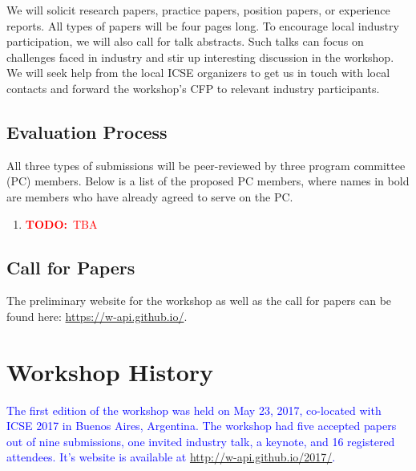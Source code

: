 \documentclass[10pt, conference]{IEEEtran}
\newcommand{\todo}[1]{{\textcolor{red}{\textbf{TODO:}~#1}}}
\newcommand{\updated}[1]{{\textcolor{blue}{#1}}}
\begin{document}
We will solicit research papers, practice papers, position papers, or experience reports. All types of papers will be four pages long. To encourage local industry participation, we will also call for talk abstracts. Such talks can focus on challenges faced in industry and stir up interesting discussion in the workshop. We will seek help from the local ICSE organizers to get us in touch with local contacts and forward the workshop's CFP to relevant industry participants.

\subsection{Evaluation Process}
All three types of submissions will be peer-reviewed by three program committee (PC) members. Below is a list of the proposed PC members, where names in bold are members who have already agreed to serve on the PC\@.

\begin{enumerate}
\setlength\itemsep{5pt}
\item \todo{TBA}
\end{enumerate}

\subsection{Call for Papers}
The preliminary website for the workshop as well as the call for papers can be found here: \url{https://w-api.github.io/}.

\section{Workshop History}

\updated{The first edition of the workshop was held on May 23, 2017, co-located with ICSE 2017 in Buenos Aires, Argentina. The workshop had five accepted papers out of nine submissions, one invited industry talk, a keynote, and 16 registered attendees. It's website is available at \url{http://w-api.github.io/2017/}.}
\end{document}
